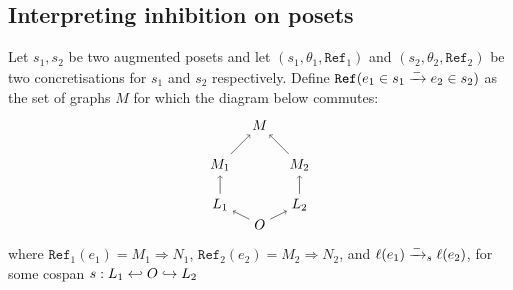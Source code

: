 \subsection{Interpreting inhibition on posets}

\begin{definition}
  \label{def:ref_neg_infl}
  Let $s_1,s_2$ be two augmented posets and let $(s_1,\theta_1,\mathtt{Ref}_1)$ and $(s_2,\theta_2,\mathtt{Ref}_2)$ be two concretisations for $s_1$ and $s_2$ respectively.
  Define $\mathtt{Ref}(e_1\in s_1\mathrel{\xrightarrow{-}} e_2\in s_2)$ as the set of graphs $M$ for which the diagram below commutes:
  \[
  \begin{tikzpicture} %
    \node (o) at (0,-0.5) {\(O\)};
    \node (n) at (0,2) {\(M\)};
    \node (l1) at (-1,0) {\(L_1\)};
    \node (l2) at (1,0) {\(L_2\)};
    \node (n1) at (-1,1) {\(M_1\)};
    \node (n2) at (1,1) {\(M_2\)};
    \draw [->] (l1) -- (n1);
    \draw [->] (l2) -- (n2);
    \draw [->] (o) -- (l1);
    \draw [->] (o) -- (l2);
    \draw [->] (n1) -- (n);
    \draw [->] (n2) -- (n);
  \end{tikzpicture}
  \]
  where $\mathtt{Ref}_1(e_1) = M_1\Rightarrow N_1$, $\mathtt{Ref}_2(e_2) = M_2\Rightarrow N_2$, and $\ell(e_1)\mathrel{\xrightarrow{-}}_s\ell(e_2)$, for some cospan $s:L_1\hookleftarrow O\hookrightarrow L_2$
\end{definition}
